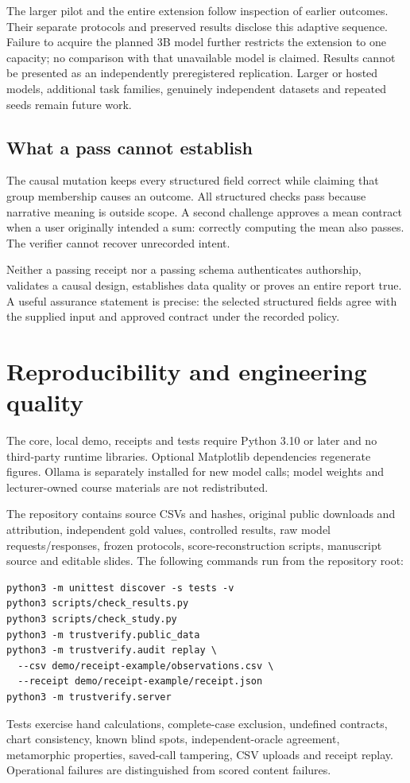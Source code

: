 The larger pilot and the entire extension follow inspection of earlier outcomes. Their separate protocols and preserved results disclose this adaptive sequence. Failure to acquire the planned 3B model further restricts the extension to one capacity; no comparison with that unavailable model is claimed. Results cannot be presented as an independently preregistered replication. Larger or hosted models, additional task families, genuinely independent datasets and repeated seeds remain future work.

\subsection{What a pass cannot establish}
The causal mutation keeps every structured field correct while claiming that group membership causes an outcome. All structured checks pass because narrative meaning is outside scope. A second challenge approves a mean contract when a user originally intended a sum: correctly computing the mean also passes. The verifier cannot recover unrecorded intent.

Neither a passing receipt nor a passing schema authenticates authorship, validates a causal design, establishes data quality or proves an entire report true. A useful assurance statement is precise: the selected structured fields agree with the supplied input and approved contract under the recorded policy.

\section{Reproducibility and engineering quality}
The core, local demo, receipts and tests require Python 3.10 or later and no third-party runtime libraries. Optional Matplotlib dependencies regenerate figures. Ollama is separately installed for new model calls; model weights and lecturer-owned course materials are not redistributed.

The repository contains source CSVs and hashes, original public downloads and attribution, independent gold values, controlled results, raw model requests/responses, frozen protocols, score-reconstruction scripts, manuscript source and editable slides. The following commands run from the repository root:
\begin{lstlisting}[style=commands,caption={Offline checks and local demonstration.}]
python3 -m unittest discover -s tests -v
python3 scripts/check_results.py
python3 scripts/check_study.py
python3 -m trustverify.public_data
python3 -m trustverify.audit replay \
  --csv demo/receipt-example/observations.csv \
  --receipt demo/receipt-example/receipt.json
python3 -m trustverify.server
\end{lstlisting}
Tests exercise hand calculations, complete-case exclusion, undefined contracts, chart consistency, known blind spots, independent-oracle agreement, metamorphic properties, saved-call tampering, CSV uploads and receipt replay. Operational failures are distinguished from scored content failures.

